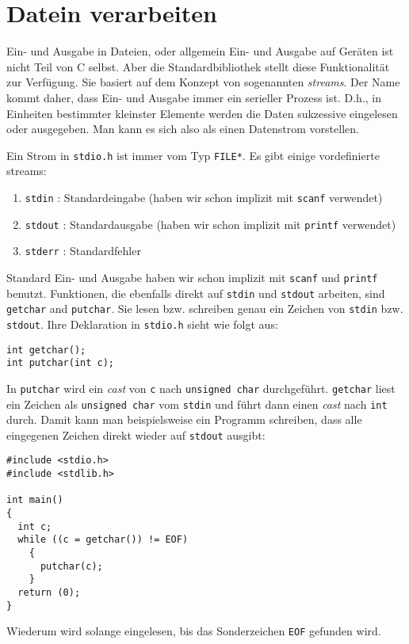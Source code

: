 \section{Datein verarbeiten}

Ein- und Ausgabe in Dateien, oder allgemein Ein- und Ausgabe auf Geräten ist nicht Teil von C selbst.
Aber die Standardbibliothek stellt diese Funktionalität zur Verfügung.
Sie basiert auf dem Konzept von sogenannten \emph{streams}.
Der Name kommt daher, dass Ein- und Ausgabe immer ein serieller Prozess ist.
D.h., in Einheiten bestimmter kleinster Elemente werden die Daten sukzessive eingelesen oder ausgegeben.
Man kann es sich also als einen Datenstrom vorstellen.

Ein Strom in \verb|stdio.h| ist immer vom Typ \verb|FILE*|.
Es gibt einige vordefinierte streams:
\begin{enumerate}
\item \verb|stdin| : Standardeingabe (haben wir schon implizit mit \texttt{scanf} verwendet) 
\item \texttt{stdout} : Standardausgabe (haben wir schon implizit mit \texttt{printf} verwendet) 
\item \texttt{stderr} : Standardfehler
\end{enumerate} 
Standard Ein- und Ausgabe haben wir schon implizit mit \texttt{scanf} und \texttt{printf} benutzt.
Funktionen, die ebenfalls direkt auf \verb|stdin| und \texttt{stdout} arbeiten, sind \verb|getchar| and \verb|putchar|.
Sie lesen bzw. schreiben genau ein Zeichen von \verb|stdin| bzw. \texttt{stdout}.
Ihre Deklaration in \verb|stdio.h| sieht wie folgt aus:
\begin{lstlisting}
int getchar();
int putchar(int c);
\end{lstlisting}
In \verb|putchar| wird ein \emph{cast} von \verb|c| nach \verb|unsigned char| durchgeführt.
\verb|getchar| liest ein Zeichen als \verb|unsigned char| vom \verb|stdin| und führt dann einen \emph{cast} nach \verb|int| durch.
Damit kann man beispielsweise ein Programm schreiben, dass alle eingegenen Zeichen direkt wieder auf \texttt{stdout} ausgibt:
\begin{lstlisting}
#include <stdio.h>
#include <stdlib.h>

int main()
{
  int c;
  while ((c = getchar()) != EOF)
    {
      putchar(c);
    }
  return (0);
}
\end{lstlisting}
Wiederum wird solange eingelesen, bis das Sonderzeichen \verb|EOF| gefunden wird.

